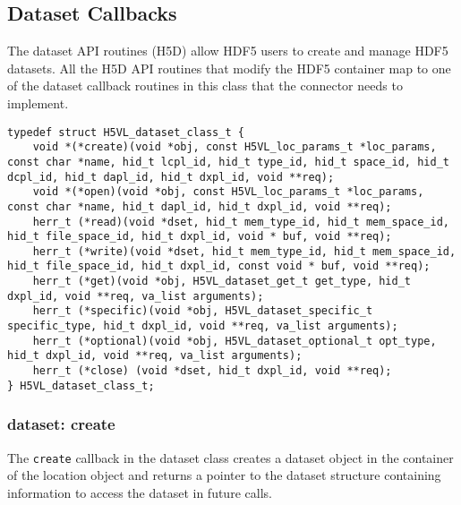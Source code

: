 
\subsection{Dataset Callbacks}
The dataset API routines (H5D) allow HDF5 users to create and manage
HDF5 datasets. All the H5D API routines that modify the HDF5 container
map to one of the dataset callback routines in this class that the
connector needs to implement.

\begin{lstlisting}[caption={Structure for dataset callback routines, H5VLconnector.h}, captionpos=b, label={lst:DSclass}]
typedef struct H5VL_dataset_class_t {                                            
    void *(*create)(void *obj, const H5VL_loc_params_t *loc_params, const char *name, hid_t lcpl_id, hid_t type_id, hid_t space_id, hid_t dcpl_id, hid_t dapl_id, hid_t dxpl_id, void **req);
    void *(*open)(void *obj, const H5VL_loc_params_t *loc_params, const char *name, hid_t dapl_id, hid_t dxpl_id, void **req);
    herr_t (*read)(void *dset, hid_t mem_type_id, hid_t mem_space_id, hid_t file_space_id, hid_t dxpl_id, void * buf, void **req);
    herr_t (*write)(void *dset, hid_t mem_type_id, hid_t mem_space_id, hid_t file_space_id, hid_t dxpl_id, const void * buf, void **req);
    herr_t (*get)(void *obj, H5VL_dataset_get_t get_type, hid_t dxpl_id, void **req, va_list arguments);
    herr_t (*specific)(void *obj, H5VL_dataset_specific_t specific_type, hid_t dxpl_id, void **req, va_list arguments);
    herr_t (*optional)(void *obj, H5VL_dataset_optional_t opt_type, hid_t dxpl_id, void **req, va_list arguments);
    herr_t (*close) (void *dset, hid_t dxpl_id, void **req);
} H5VL_dataset_class_t; 
\end{lstlisting}

\subsubsection{dataset: create}
The \texttt{create} callback in the dataset class creates a dataset
object in the container of the location object and returns a pointer
to the dataset structure containing information to access the dataset
in future calls.\bigskip

